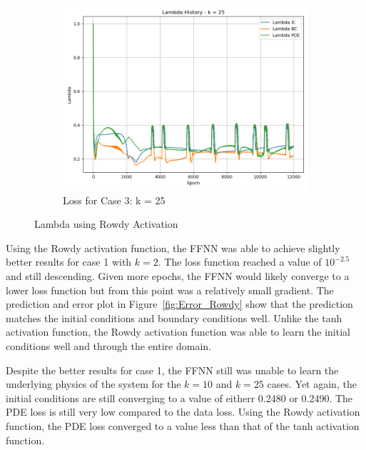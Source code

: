 \documentclass[11pt]{article}
\begin{document}
\begin{figure}[h!]
\begin{subfigure}[b]{0.48\textwidth}
        \includegraphics[width=\textwidth]{2D_Lambda_K3.png}
        \caption{Loss for Case 3: k = 25}
        \label{fig:Lambda_K3_Rowdy}
    \end{subfigure}
    \caption{Lambda using Rowdy Activation}
    \label{fig:Lambda_Rowdy}
\end{figure}

Using the Rowdy activation function, the FFNN was able to achieve slightly better results for case 1 with $k=2$. The loss function reached a value of $10^{-2.5}$ and still descending. Given more epochs, the FFNN would likely converge to a lower loss function but from this point was a relatively small gradient. The prediction and error plot in Figure~\ref{fig:Error_Rowdy} show that the prediction matches the initial conditions and boundary conditions well. Unlike the tanh activation function, the Rowdy activation function was able to learn the initial conditions well and through the entire domain. 

Despite the better results for case 1, the FFNN still was unable to learn the underlying physics of the system for the $k=10$ and $k=25$ cases. Yet again, the initial conditions are still converging to a value of eitherr 0.2480 or 0.2490. The PDE loss is still very low compared to the data loss. Using the Rowdy activation function, the PDE loss converged to a value less than that of the tanh activation function.
\end{document}
